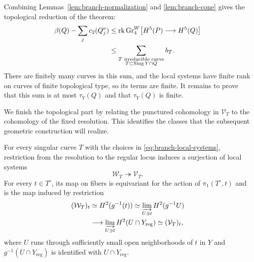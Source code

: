Combining Lemmas~\ref{lem:branch-normalization} and
\ref{lem:branch-cone} gives the topological reduction of the theorem:
\begin{equation}\label{eq:branch-topological-bound}
 \begin{aligned}
 \beta(Q)-\sum_jc_2(Q_j^\nu)
 &\leq \operatorname{rk}\operatorname{Gr}^W_4\bigl[H^5(P)\longrightarrow H^5(Q)\bigr]\\
 &\leq
 \sum_{\substack{T\text{ irreducible curve}\\T\subset\operatorname{Sing} Y\cap Q}} b_T.
 \end{aligned}
\end{equation}
There are finitely many curves in this sum, and the local systems have
finite rank on curves of finite topological type, so its terms are
finite.  It remains to prove that this sum is at most $\tau_Y(Q)$ and
that $\tau_Y(Q)$ is finite.

We finish the topological part by relating the punctured cohomology
in $\mathcal V_T$ to the cohomology of the fixed resolution.  This
identifies the classes that the subsequent geometric construction
will realize.

\begin{lemma}
\label{lem:link-quotient}
For every singular curve $T$ with the choices in
\eqref{eq:branch-local-systems}, restriction from the resolution to
the regular locus induces a surjection of local systems
\begin{equation}\label{eq:branch-link-quotient}
 \mathcal W_T\twoheadrightarrow\mathcal V_T.
\end{equation}
For every $t\in T^\circ$, its map on fibers is equivariant for the
action of $\pi_1(T^\circ,t)$ and is the map induced by restriction
\begin{equation}\label{eq:branch-link-stalk-map}
 \begin{aligned}
 (\mathcal W_T)_t
 &\simeq H^2(g^{-1}(t))
  \simeq\varinjlim_{U\ni t}H^2(g^{-1}U)\\
 &\longrightarrow\varinjlim_{U\ni t}H^2(U\cap Y_{\mathrm{reg}})
  \simeq(\mathcal V_T)_t,
 \end{aligned}
\end{equation}
where $U$ runs through sufficiently small open neighborhoods of $t$
in $Y$ and $g^{-1}(U\cap Y_{\mathrm{reg}})$ is identified with
$U\cap Y_{\mathrm{reg}}$.
\end{lemma}

